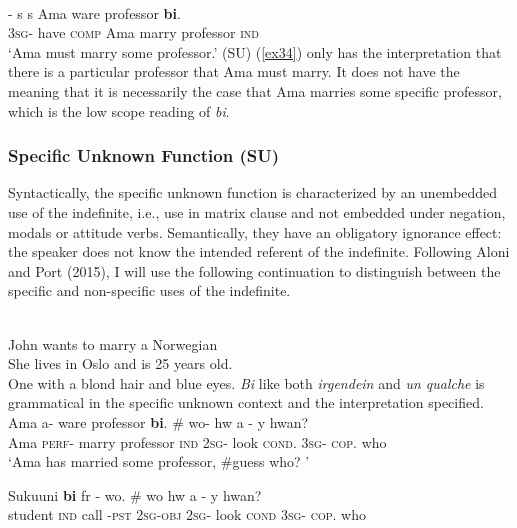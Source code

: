 \documentclass[output=paper,
modfonts
]{langsci/langscibook}
\begin{document}
\ea\label{ex34}\\
 \gll {}- s  s Ama ware professor \textbf{bi}.\\
\textsc{3sg}- have \textsc{comp} Ama marry professor \textsc{ind} \\
    
\glt `Ama must marry some professor.' (SU)
\z (\ref{ex34}) only has the interpretation that there is a particular professor that Ama must marry. It does not have the meaning that it is necessarily the case that Ama marries some specific professor, which is the low scope reading of \emph{bi}. 



\subsubsection{Specific Unknown Function (SU)}
Syntactically, the specific unknown function is characterized by an unembedded use of the indefinite, i.e., use in matrix clause and not embedded under negation, modals or attitude verbs. Semantically, they have an obligatory ignorance effect: the speaker does not know the intended referent of the indefinite. Following Aloni and Port (2015), I will use the following continuation to distinguish between the specific and non-specific uses of the indefinite.

\ea\label{ex40}\\
 John wants to marry a Norwegian\\
 \ea
 She lives in Oslo and is 25 years old.\\
\ex One with a blond hair and blue eyes.
\z\z
\emph{Bi} like both \emph{irgendein} and \emph{un qualche} is grammatical in the specific unknown context  and the interpretation specified. 
\ea {}\\
\ea\label{ex42}
 \gll  Ama a- ware professor \textbf{bi}. \# wo- hw a - y hwan?\\
Ama \textsc{perf}- marry professor \textsc{ind} {} \textsc{2sg}- look  \textsc{cond}. \textsc{3sg}- \textsc{cop}. who \\
    
\glt `Ama has married some professor, \#guess who? ' 

\ex 
\gll  Sukuuni \textbf{bi} fr - wo. \# wo hw a - y hwan?\\
student  \textsc{ind} call -\textsc{pst}       \textsc{2sg}-\textsc{obj} {} \textsc{2sg}- look  \textsc{cond} \textsc{3sg}- \textsc{cop}. who\\
    
\end{document}
